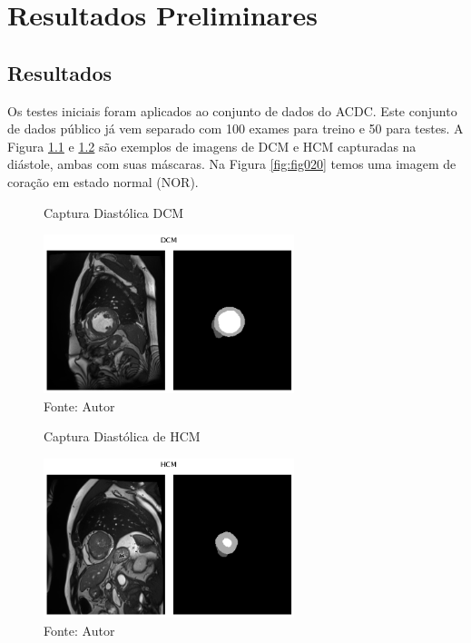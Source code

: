 \chapter{Resultados  Preliminares}
\label{chap:resultados_discussao}

\section{Resultados} 
\label{sec:cap6_resultados}

Os testes iniciais foram aplicados ao conjunto de dados do \gls{ACDC}. Este conjunto de dados público já vem separado com 100 exames para treino e 50 para testes. A Figura \ref{fig:fig018} e \ref{fig:fig019} são exemplos de imagens de \gls{DCM} e \gls{HCM} capturadas na diástole, ambas com suas máscaras. Na Figura \ref{fig:fig020} temos uma imagem de coração em estado normal (\gls{NOR}).

\begin{figure}[htbp]
    \caption{Captura Diastólica DCM}
    \centering
    \includegraphics[width=0.65\textwidth]{figures/fig018.png}
    \caption{Fonte: Autor}
    \label{fig:fig018}
\end{figure}

\begin{figure}[htbp]
    \caption{Captura Diastólica de HCM}
    \centering
    \includegraphics[width=0.65\textwidth]{figures/fig019.png}
    \caption{Fonte: Autor}
    \label{fig:fig019}
\end{figure}

